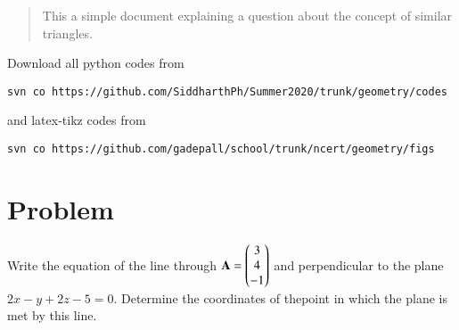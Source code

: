 \documentclass[journal,12pt,twocolumn]{IEEEtran}
\begin{document}
%
\begin{abstract}
This a simple document explaining a question about the concept of similar triangles.
\end{abstract}
Download all python codes from 
%
\begin{lstlisting}
svn co https://github.com/SiddharthPh/Summer2020/trunk/geometry/codes
\end{lstlisting}
%
and latex-tikz codes from 
%
\begin{lstlisting}
svn co https://github.com/gadepall/school/trunk/ncert/geometry/figs
\end{lstlisting}
%
\section{Problem}
Write the equation of the line through $\mathbf{A} = \begin{pmatrix}3 \\4\\-1\end{pmatrix}$ and perpendicular to the plane $2x-y+2z-5=0$. Determine the coordinates of thepoint in which the plane is met by this line.   
\end{document}

